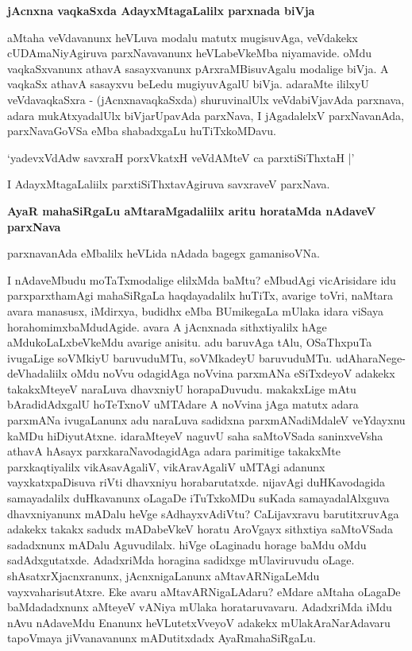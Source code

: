 {\bf jAcnxna vaqkaSxda AdayxMtagaLalilx parxnada biVja}

aMtaha veVdavanunx heVLuva modalu matutx mugisuvAga, veVdakekx cUDAmaNiyAgiruva parxNavavanunx heVLabeVkeMba niyamavide. oMdu vaqkaSxvanunx athavA sasayxvanunx pArxraMBisuvAgalu modalige biVja. A vaqkaSx athavA sasayxvu beLedu mugiyuvAgalU biVja. adaraMte ililxyU veVdavaqkaSxra - (jAcnxnavaqkaSxda) shuruvinalUlx veVdabiVjavAda parxnava, adara mukAtxyadalUlx biVjarUpavAda parxNava, I jAgadalelxV parxNavanAda, parxNavaGoVSa eMba shabadxgaLu huTiTxkoMDavu.

\begin{shloka}
`yadevxVdAdw savxraH porxVkatxH veVdAMteV ca parxtiSiThxtaH |'
\end{shloka}

I AdayxMtagaLaliilx parxtiSiThxtavAgiruva savxraveV parxNava.

{\bf AyaR mahaSiRgaLu aMtaraMgadaliilx aritu horataMda nAdaveV parxNava}

parxnavanAda eMbalilx heVLida nAdada bagegx gamanisoVNa.

I nAdaveMbudu moTaTxmodalige elilxMda baMtu? eMbudAgi vicArisidare idu parxparxthamAgi mahaSiRgaLa haqdayadalilx huTiTx, avarige toVri, naMtara avara manasusx, iMdirxya, budidhx eMba BUmikegaLa mUlaka idara viSaya horahomimxbaMdudAgide. avara A jAcnxnada sithxtiyalilx hAge aMdukoLaLxbeVkeMdu avarige anisitu. adu baruvAga tAlu, OSaThxpuTa ivugaLige soVMkiyU baruvuduMTu, soVMkadeyU baruvuduMTu. udAharaNege- deVhadaliilx oMdu noVvu odagidAga noVvina parxmANa eSiTxdeyoV adakekx takakxMteyeV naraLuva dhavxniyU horapaDuvudu. makakxLige mAtu bAradidAdxgalU hoTeTxnoV uMTAdare A noVvina jAga matutx adara parxmANa ivugaLanunx adu naraLuva sadidxna parxmANadiMdaleV veYdayxnu kaMDu hiDiyutAtxne. idaraMteyeV naguvU saha saMtoVSada saninxveVsha athavA hAsayx parxkaraNavodagidAga adara parimitige takakxMte parxkaqtiyalilx vikAsavAgaliV, vikAravAgaliV uMTAgi adanunx vayxkatxpaDisuva riVti dhavxniyu horabarutatxde. nijavAgi duHKavodagida samayadalilx duHkavanunx oLagaDe iTuTxkoMDu suKada samayadalAlxguva dhavxniyanunx mADalu heVge sAdhayxvAdiVtu? CaLijavxravu barutitxruvAga adakekx takakx sadudx mADabeVkeV horatu AroVgayx sithxtiya saMtoVSada sadadxnunx mADalu Aguvudilalx. hiVge oLaginadu horage baMdu oMdu sadAdxgutatxde. AdadxriMda horagina sadidxge mUlaviruvudu oLage. shAsatxrXjacnxranunx, jAcnxnigaLanunx aMtavARNigaLeMdu vayxvaharisutAtxre. Eke avaru aMtavARNigaLAdaru? eMdare aMtaha oLagaDe baMdadadxnunx aMteyeV vANiya mUlaka horataruvavaru. AdadxriMda iMdu nAvu nAdaveMdu Enanunx heVLutetxVveyoV adakekx mUlakAraNarAdavaru tapoVmaya jiVvanavanunx mADutitxdadx AyaRmahaSiRgaLu.

